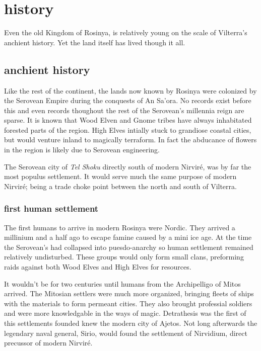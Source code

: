 \documentclass[../main.tex]{subfiles}
\begin{document}



\section{history} 
Even the old Kingdom of Rosinya, is relatively young on the scale of Vilterra's anchient 
history. Yet the land itself has lived though it all.

\subsection{anchient history}
Like the rest of the continent, the lands now known by Rosinya were colonized by the 
Serovean Empire during the conquests of An Sa'ora. No records exist before this and even
records thoughout the rest of the Serovean's millennia reign are sparse. It is known that 
Wood Elven and Gnome tribes have always inhabitated forested parts of the region. High Elves
intially stuck to grandiose coastal cities, but would venture inland to magically terraform.
In fact the abducance of flowers in the region is likely due to Serovean engineering. 

The Serovean city of \emph{Tel Shoku} directly south of modern Nirviré, was by far the most 
populus settlement. It would serve much the same purpose of modern Nirviré; being a trade choke 
point between the north and south of Vilterra. 

\subsubsection{first human settlement}
The first humans to arrive in modern Rosinya were Nordic. They arrived a millinium and a half ago 
to escape famine caused by a mini ice age. At the time the Serovean's had collapsed into puesdo-anarchy
so human settlement remained relatively undisturbed. These groups would only form small clans, preforming 
raids against both Wood Elves and High Elves for resources.

It wouldn't be for two centuries until humans from the Archipelligo of Mitos arrived.
The Mitosian settlers were much more organized, bringing fleets of ships with the materials 
to form permeant cities. They also brought professial soldiers and were more knowledgable in the ways of 
magic. Detrathesis was the first of this settlements founded knew the modern city of Ajetos. Not long afterwards
the legendary naval general, Sirio, would found the settlement of Nirvidium, direct precussor of modern Nirviré.
\end{document}
